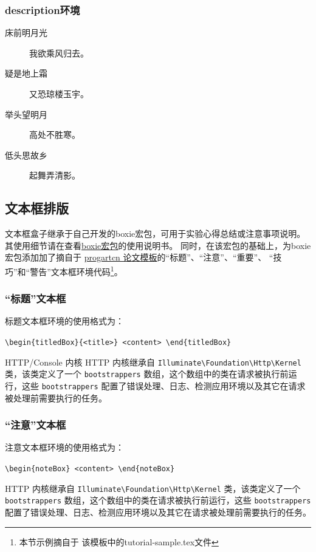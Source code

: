 \documentclass{sysucseexp}
\begin{document}
\subsubsection{description环境}
\begin{description}
\item[床前明月光] 我欲乘风归去。
\item[疑是地上霜] 又恐琼楼玉宇。
\item[举头望明月] 高处不胜寒。
\item[低头思故乡] 起舞弄清影。
\end{description}
\subsection{文本框排版}
文本框盒子继承于自己开发的boxie宏包，可用于实验心得总结或注意事项说明。
其使用细节请在\github{}查看\href{https://github.com/registor/boxiesty}{boxie宏包}的使用说明书。
同时，在该宏包的基础上，为boxie宏包添加加了摘自于
\href{https://github.com/WisdomFusion/latex-templates/tree/master/progartcn}{progartcn
  论文模板}的\enquote{标题}、\enquote{注意}、\enquote{重要}、
\enquote{技巧}和\enquote{警告}文本框环境代码\footnote{本节示例摘自于
  该模板中的tutorial-sample.tex文件}。
\subsubsection{\enquote{标题}文本框}
标题文本框环境的使用格式为：

\verb|\begin{titledBox}{<title>} <content> \end{titledBox}|

\begin{titledBox}{HTTP/Console 内核}
  HTTP 内核继承自 \verb|Illuminate\Foundation\Http\Kernel| 类，该类定义了一个 \verb|bootstrappers| 数组，这个数组中的类在请求被执行前运行，这些 \verb|bootstrappers| 配置了错误处理、日志、检测应用环境以及其它在请求被处理前需要执行的任务。
\end{titledBox}
\subsubsection{\enquote{注意}文本框}
注意文本框环境的使用格式为：

\verb|\begin{noteBox} <content> \end{noteBox}|

\begin{noteBox}
  HTTP 内核继承自 \verb|Illuminate\Foundation\Http\Kernel| 类，该类定义了一个 \verb|bootstrappers| 数组，这个数组中的类在请求被执行前运行，这些 \verb|bootstrappers| 配置了错误处理、日志、检测应用环境以及其它在请求被处理前需要执行的任务。
\end{noteBox}
\end{document}
